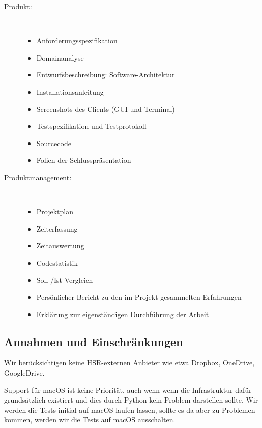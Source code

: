 \documentclass[a4paper]{article}
\begin{document}
\begin{multicols}{2}
  \begin{description}
    \item[Produkt:] \strut \\[-1em]
    \begin{itemize}
      \item Anforderungsspezifikation
      \item Domainanalyse
      \item Entwurfsbeschreibung: Software-Architektur
      \item Installationsanleitung
      \item Screenshots des Clients (GUI und Terminal)
      \item Testspezifikation und Testprotokoll
      \item Sourcecode
      \item Folien der Schlusspräsentation
    \end{itemize}
    \item[Produktmanagement:] \strut \\[-1em]
    \begin{itemize}
      \item Projektplan
      \item Zeiterfassung
      \item Zeitauswertung
      \item Codestatistik
      \item Soll-/Ist-Vergleich
      \item Persönlicher Bericht zu den im Projekt gesammelten Erfahrungen
      \item Erklärung zur eigenständigen Durchführung der Arbeit
    \end{itemize}
  \end{description}
\end{multicols}

\subsection{Annahmen und Einschränkungen}
Wir berücksichtigen keine HSR-externen Anbieter wie etwa Dropbox, OneDrive, GoogleDrive.

Support für macOS ist keine Priorität, auch wenn wenn die Infrastruktur dafür
grundsätzlich existiert und dies durch Python kein Problem darstellen sollte.
Wir werden die Tests initial auf macOS laufen lassen, sollte es da aber zu
Problemen kommen, werden wir die Tests auf macOS ausschalten.
\end{document}
